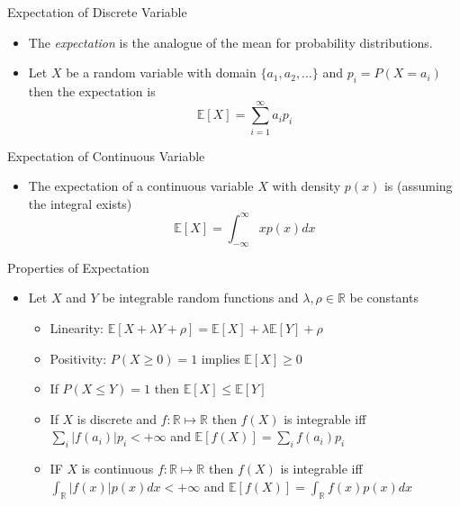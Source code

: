 \documentclass{beamer}
\begin{document}
\begin{frame}{Expectation of Discrete Variable} 
\begin{itemize} 
 \item The \emph{expectation} is the analogue of the mean for probability distributions.
 \item Let $X$ be a random variable with domain $\{a_1, a_2, \ldots \}$ and $p_i = P(X = a_i)$ then the expectation is 
 \begin{displaymath} 
  \mathbb{E}[X] = \sum_{i=1}^\infty a_i p_i
 \end{displaymath}
\end{itemize}
\end{frame}

\begin{frame}{Expectation of Continuous Variable} 
\begin{itemize} 
 \item The expectation of a continuous variable $X$ with density $p(x)$ is (assuming the integral exists) 
 \begin{displaymath} 
  \mathbb{E}[X] = \int_{-\infty}^\infty x p(x) dx
 \end{displaymath}
\end{itemize}
\end{frame}

\begin{frame}{Properties of Expectation} 
\begin{itemize} 
 \item Let $X$ and $Y$ be integrable random functions and $\lambda, \rho \in \mathbb{R}$ be constants
 \begin{itemize}
 \item Linearity: $\mathbb{E}[X + \lambda Y + \rho] = \mathbb{E}[X] +  \lambda \mathbb{E}[Y] + \rho$ 
 \item Positivity: $P(X \geq 0) = 1$ implies $\mathbb{E}[X] \geq 0$ 
 \item If $P(X \leq Y) = 1$ then $\mathbb{E}[X] \leq \mathbb{E}[Y]$
\item If $X$ is discrete and $f: \mathbb{R} \mapsto \mathbb{R}$ then $f(X)$ is integrable iff $\sum_i |f(a_i)| p_i < + \infty$ and $\mathbb{E}[f(X)] =  \sum_i f(a_i) p_i$ 
\item IF $X$ is continuous $f: \mathbb{R} \mapsto \mathbb{R}$ then $f(X)$ is integrable iff $\int_\mathbb{R} |f(x)| p(x) dx < +\infty$ and $\mathbb{E}[f(X)] = \int_\mathbb{R} f(x)p(x) dx $ 
\end{itemize} 
\end{itemize} 
\end{frame}
\end{document}
